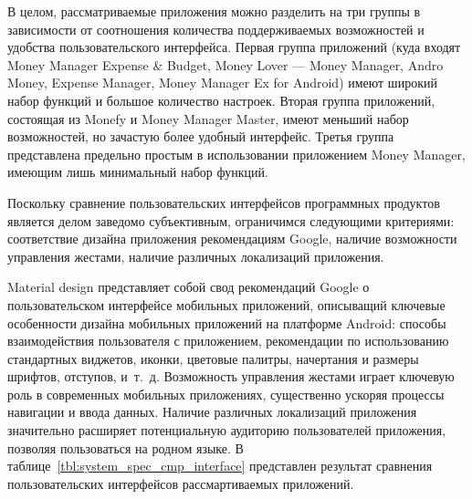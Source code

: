 В целом, рассматриваемые приложения можно разделить на три группы в
зависимости от соотношения количества поддерживаемых
возможностей и удобства пользовательского интерфейса.
Первая группа приложений (куда входят Money Manager Expense \& Budget,
Money Lover --- Money Manager, Andro Money, Expense Manager,
Money Manager Ex for Android)
имеют широкий набор функций и большое количество настроек.
Вторая группа приложений, состоящая из Monefy и Money Manager Master,
имеют меньший набор возможностей, но зачастую более удобный интерфейс.
Третья группа представлена предельно простым в использовании приложением Money Manager,
имеющим лишь минимальный набор функций.

Поскольку сравнение пользовательских интерфейсов программных продуктов
является делом заведомо субъективным, ограничимся следующими критериями:
соответствие дизайна приложения рекомендациям Google, наличие возможности управления жестами,
наличие различных локализаций приложения.

Material design представляет собой свод рекомендаций Google о пользовательском
интерфейсе мобильных приложений, описыващий ключевые особенности дизайна мобильных
приложений на платформе Android: способы взаимодействия пользователя с приложением,
рекомендации по использованию стандартных виджетов,
иконки, цветовые палитры, начертания и размеры шрифтов, отступов, и~т.~д.
Возможность управления жестами играет ключевую роль в современных мобильных приложениях,
существенно ускоряя процессы навигации и ввода данных.
Наличие различных локализаций приложения значительно расширяет потенциальную
аудиторию пользователей приложения, позволяя пользоваться на родном языке.
В таблице~\ref{tbl:system_spec_cmp_interface} представлен результат сравнения
пользовательских интерфейсов рассмартиваемых приложений.

